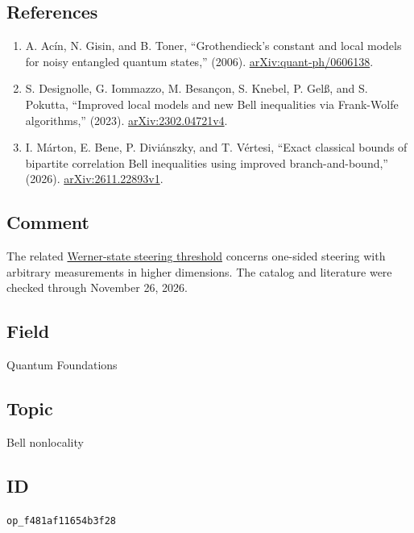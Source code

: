 \subsection*{References}

\begin{enumerate}[label={},leftmargin=4.8em,labelsep=0.5em]
  \footnotesize
  \item[\textup{[AGT06]}]\label{ref:d8-03-agt06}
  A. Acín, N. Gisin, and B. Toner, ``Grothendieck's constant and local models for noisy entangled quantum states,'' (2006). \href{https://arxiv.org/abs/quant-ph/0606138}{arXiv:quant-ph/0606138}.

  \item[\textup{[DIB+23]}]\label{ref:d8-03-dib-23}
  S. Designolle, G. Iommazzo, M. Besançon, S. Knebel, P. Gelß, and S. Pokutta, ``Improved local models and new Bell inequalities via Frank-Wolfe algorithms,'' (2023). \href{https://arxiv.org/abs/2302.04721v4}{arXiv:2302.04721v4}.

  \item[\textup{[MBDV26]}]\label{ref:d8-03-mbdv26}
  I. Márton, E. Bene, P. Diviánszky, and T. Vértesi, ``Exact classical bounds of bipartite correlation Bell inequalities using improved branch-and-bound,'' (2026). \href{https://arxiv.org/abs/2611.22893v1}{arXiv:2611.22893v1}.
\end{enumerate}

\subsection*{Comment}

The related \href{https://qiqc-op.com/problem/op_2982ddd94453b5b6/}{Werner-state steering threshold} concerns one-sided steering with arbitrary measurements in higher dimensions. The catalog and literature were checked through November 26, 2026.

\subsection*{Field}

Quantum Foundations

\subsection*{Topic}

Bell nonlocality

\subsection*{ID}

\texttt{op\_f481af11654b3f28}
